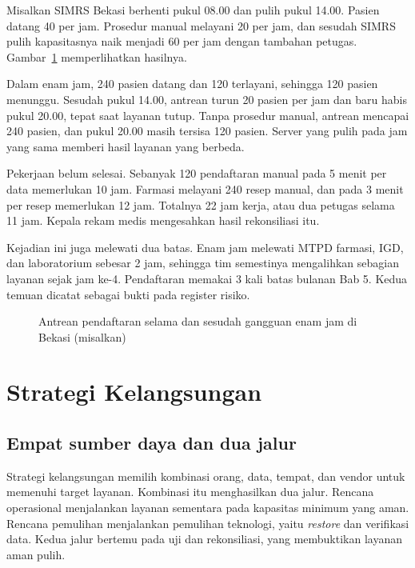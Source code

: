 \begin{kasus}[title={Kasus Medikara Health: Enam Jam di Bekasi}]
Misalkan SIMRS Bekasi berhenti pukul 08.00 dan pulih pukul 14.00. Pasien datang 40 per jam.
Prosedur manual melayani 20 per jam, dan sesudah SIMRS pulih kapasitasnya naik menjadi 60 per jam
dengan tambahan petugas. Gambar~\ref{fig:ch10-antrean} memperlihatkan hasilnya.

Dalam enam jam, 240 pasien datang dan 120 terlayani, sehingga 120 pasien menunggu. Sesudah pukul
14.00, antrean turun 20 pasien per jam dan baru habis pukul 20.00, tepat saat layanan tutup. Tanpa
prosedur manual, antrean mencapai 240 pasien, dan pukul 20.00 masih tersisa 120 pasien. Server yang
pulih pada jam yang sama memberi hasil layanan yang berbeda.

Pekerjaan belum selesai. Sebanyak 120 pendaftaran manual pada 5 menit per data memerlukan 10 jam.
Farmasi melayani 240 resep manual, dan pada 3 menit per resep memerlukan 12 jam. Totalnya 22 jam
kerja, atau dua petugas selama 11 jam. Kepala rekam medis mengesahkan hasil rekonsiliasi itu.

Kejadian ini juga melewati dua batas. Enam jam melewati MTPD farmasi, IGD, dan laboratorium sebesar
2 jam, sehingga tim semestinya mengalihkan sebagian layanan sejak jam ke-4. Pendaftaran memakai 3
kali batas bulanan Bab 5. Kedua temuan dicatat sebagai bukti pada register risiko.
\end{kasus}

\begin{figure}[!htb]
  \centering
  
  \caption{Antrean pendaftaran selama dan sesudah gangguan enam jam di Bekasi (misalkan)}
  \label{fig:ch10-antrean}
\end{figure}

\section{Strategi Kelangsungan}

\subsection*{Empat sumber daya dan dua jalur}

Strategi kelangsungan memilih kombinasi orang, data, tempat, dan vendor untuk memenuhi target
layanan. Kombinasi itu menghasilkan dua jalur. Rencana operasional menjalankan layanan sementara
pada kapasitas minimum yang aman. Rencana pemulihan menjalankan pemulihan teknologi, yaitu
\textit{restore} dan verifikasi data. Kedua jalur bertemu pada uji dan rekonsiliasi, yang
membuktikan layanan aman pulih.

